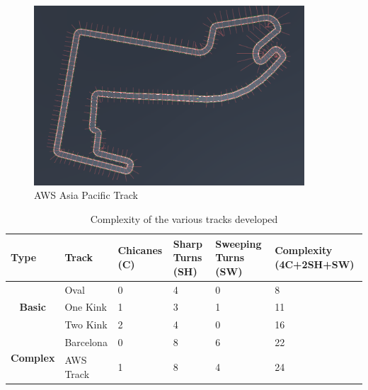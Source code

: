 \begin{figure}[H]
    \centering
    \includegraphics[width=0.9\textwidth]{images/tracks/AWSTrack.png}
    \caption{ AWS Asia Pacific Track}
    \label{fig:awstrack}
\end{figure}



\begin{table}[H]
\centering
\begin{tabular}{|p{1.9cm}|p{2.5cm}|p{2cm}|p{1.8cm}|p{2cm}|p{3.5cm}|}
\hline
\textbf{Type}                                         & \textbf{Track} & \textbf{Chicanes (C)} & \textbf{Sharp Turns (SH)} & \textbf{Sweeping Turns (SW)} & \textbf{Complexity \newline (4C+2SH+SW)} \\ \hline
\multicolumn{1}{|c|}{\multirow{3}{*}{\textbf{Basic}}} & Oval     & 0                     & 4                         & 0                            & 8                                      \\ \cline{2-6} 
\multicolumn{1}{|c|}{}                                & One Kink       & 1                     & 3                         & 1                            & 11                                     \\ \cline{2-6} 
\multicolumn{1}{|c|}{}                                & Two Kink       & 2                     & 4                         & 0                            & 16                                     \\ \hline
\multirow{2}{*}{\textbf{Complex}}                     & Barcelona      & 0                     & 8                         & 6                            & 22                                     \\ \cline{2-6} 
                                                      & AWS Track      & 1                     & 8                         & 4                            & 24                                     \\ \hline
\end{tabular}
\caption{Complexity of the various tracks developed}
\label{tab:complexity}
\end{table}

